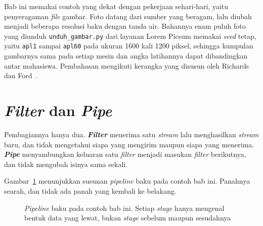Bab ini memakai contoh yang dekat dengan pekerjaan sehari-hari, yaitu
penyeragaman \textit{file} gambar. Foto datang dari sumber yang beragam, lalu
diubah menjadi beberapa resolusi baku dengan tanda air. Bahannya enam puluh foto
yang diunduh \texttt{unduh\_gambar.py} dari layanan Lorem Picsum memakai
\textit{seed} tetap, yaitu \texttt{apl1} sampai \texttt{apl60} pada ukuran
1600 kali 1200 piksel, sehingga kumpulan gambarnya sama pada setiap mesin dan
angka latihannya dapat dibandingkan antar mahasiswa. Pembahasan mengikuti
kerangka yang disusun oleh Richards dan Ford~\cite{richards2020fundamentals}.

\section{\textit{Filter} dan \textit{Pipe}}

Pembagiannya hanya dua. \textbf{\textit{Filter}} menerima satu
\textit{stream} lalu menghasilkan \textit{stream} baru,
dan tidak mengetahui siapa
yang mengirim maupun siapa yang menerima. \textbf{\textit{Pipe}} menyambungkan
keluaran satu \textit{filter} menjadi masukan \textit{filter} berikutnya, dan
tidak mengubah isinya sama sekali.

Gambar~\ref{fig:pipa-lurus} menunjukkan susunan \textit{pipeline} baku pada contoh bab ini.
Panahnya searah, dan tidak ada panah yang kembali ke belakang.

\begin{figure}[htbp]
  \centering
  \caption{\textit{Pipeline} baku pada contoh bab ini. Setiap \textit{stage} hanya mengenal bentuk
    data yang lewat, bukan \textit{stage} sebelum maupun sesudahnya}
  \label{fig:pipa-lurus}
\end{figure}

